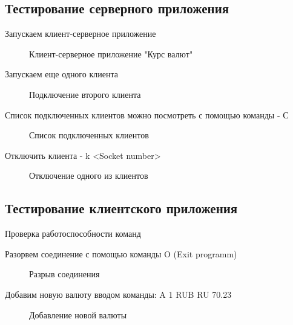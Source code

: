 \documentclass[a4paper,14pt]{article}
\begin{document}
\subsection{Тестирование серверного приложения}
Запускаем клиент-серверное приложение
\begin{figure}[h!]
	\noindent\centering{
		\texttt{[image: 1]}}
	\caption{Клиент-серверное приложение "Курс валют"}
	\label{figCurves}
\end{figure}

Запускаем еще одного клиента

\begin{figure}[h!]
	\noindent\centering{
		\texttt{[image: 2]}}
	\caption{Подключение второго клиента}
	\label{figCurves}
\end{figure}

Список подключенных клиентов можно посмотреть с помощью команды - С

\begin{figure}[h!]
	\noindent\centering{
		\texttt{[image: 3]}}
	\caption{Список подключенных клиентов}
	\label{figCurves}
\end{figure}

Отключить клиента - k <Socket number>

\begin{figure}[h!]
	\noindent\centering{
		\texttt{[image: 4]}}
	\caption{Отключение одного из клиентов}
	\label{figCurves}
\end{figure}



\newpage

\subsection{Тестирование клиентского приложения}

Проверка работоспособности команд

Разорвем соединение с помощью команды O (Exit programm)
\begin{figure}[h!]
	\noindent\centering{
		\texttt{[image: 21]}}
	\caption{Разрыв соединения}
	\label{figCurves}
\end{figure}

Добавим новую валюту вводом команды: A 1 RUB RU 70.23

\begin{figure}[h!]
	\noindent\centering{
		\texttt{[image: 5]}}
	\caption{Добавление новой валюты}
	\label{figCurves}
\end{figure}
\end{document}
